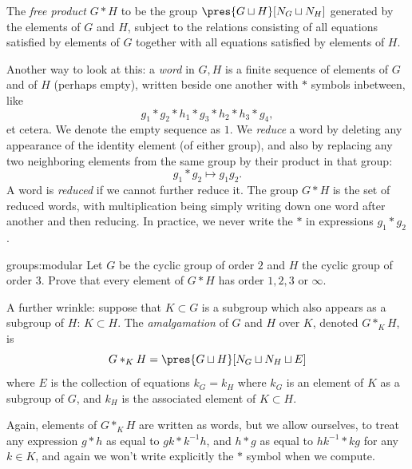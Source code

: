The \emph{free product} \(G*H\) to be the group \(\pres{G \sqcup H}[N_G \sqcup N_H]\) generated by the elements of \(G\) and \(H\), subject to the relations consisting of all equations satisfied by elements of \(G\) together with all equations satisfied by elements of \(H\).

Another way to look at this: a \emph{word} in \(G,H\) is a finite sequence of elements of \(G\) and of \(H\) (perhaps empty), written beside one another with \(*\) symbols inbetween, like
\[
g_1 * g_2 * h_1 * g_3 * h_2 * h_3 * g_4,
\]
et cetera.
We denote the empty sequence as \(1\).
We \emph{reduce} a word by deleting any appearance of the identity element (of either group), and also by replacing any two neighboring elements from the same group by their product in that group:
\[
g_1 * g_2 \mapsto g_1 g_2.
\]
A word is \emph{reduced} if we cannot further reduce it.
The group \(G*H\) is the set of reduced words, with multiplication being simply writing down one word after another and then reducing.
In practice, we never write the \(*\) in expressions \(g_1*g_2\).

\begin{problem}{groups:modular}
Let \(G\) be the cyclic group of order \(2\) and \(H\) the cyclic group of order \(3\).
Prove that every element of \(G*H\) has order \(1,2,3\) or \(\infty\).
\end{problem}

A further wrinkle: suppose that \(K \subset G\) is a subgroup which also appears as a subgroup of \(H\): \(K \subset H\).
The \emph{amalgamation} of \(G\) and \(H\) over \(K\), denoted \(G*_K H\), is
\[
G *_K H = \pres{G \sqcup H}[N_G \sqcup N_H \sqcup E]
\]
where \(E\) is the collection of equations \(k_G=k_H\) where \(k_G\) is an element of \(K\) as a subgroup of \(G\), and \(k_H\) is the associated element of \(K \subset H\).

Again, elements of \(G *_K H\) are written as words, but we allow ourselves, to treat any expression \(g*h\) as equal to \(gk*k^{-1}h\), and \(h*g\) as equal to \(hk^{-1}*kg\) for any \(k \in K\), and again we won't write explicitly the \(*\) symbol when we compute.


